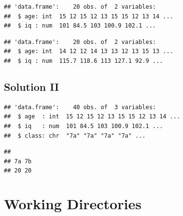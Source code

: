 \documentclass[
]{book}
\newenvironment{Shaded}{\begin{snugshade}}{\end{snugshade}}
\newcommand{\CommentTok}[1]{\textcolor[rgb]{0.56,0.35,0.01}{\textit{#1}}}
\newcommand{\FunctionTok}[1]{\textcolor[rgb]{0.13,0.29,0.53}{\textbf{#1}}}
\newcommand{\NormalTok}[1]{#1}
\newcommand{\OtherTok}[1]{\textcolor[rgb]{0.56,0.35,0.01}{#1}}
\newcommand{\SpecialCharTok}[1]{\textcolor[rgb]{0.81,0.36,0.00}{\textbf{#1}}}
\newcommand{\StringTok}[1]{\textcolor[rgb]{0.31,0.60,0.02}{#1}}
\begin{document}
\begin{verbatim}
## 'data.frame':    20 obs. of  2 variables:
##  $ age: int  15 12 15 12 13 15 15 12 13 14 ...
##  $ iq : num  101 84.5 103 100.9 102.1 ...
\end{verbatim}

\begin{verbatim}
## 'data.frame':    20 obs. of  2 variables:
##  $ age: int  14 12 12 14 13 13 12 13 15 13 ...
##  $ iq : num  115.7 118.6 113 127.1 92.9 ...
\end{verbatim}

\subsection{Solution II}\label{solution-ii}

\begin{Shaded}
\end{Shaded}

\begin{verbatim}
## 'data.frame':    40 obs. of  3 variables:
##  $ age  : int  15 12 15 12 13 15 15 12 13 14 ...
##  $ iq   : num  101 84.5 103 100.9 102.1 ...
##  $ class: chr  "7a" "7a" "7a" "7a" ...
\end{verbatim}

\begin{Shaded}
\end{Shaded}

\begin{verbatim}
## 
## 7a 7b 
## 20 20
\end{verbatim}

\section{Working Directories}\label{working-directories}
\end{document}
